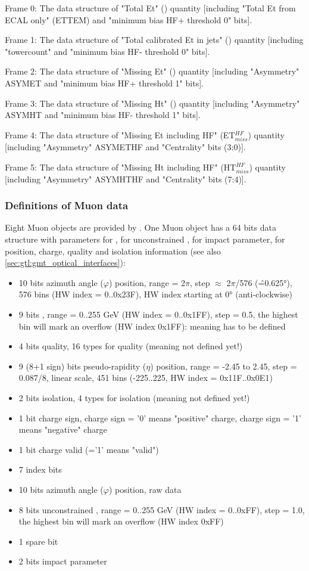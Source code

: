 Frame 0: The data structure of "Total Et" (\ett) quantity [including "Total Et from ECAL only" (ETTEM) and "minimum bias HF+ threshold 0" bits].

Frame 1: The data structure of "Total calibrated Et in jets" (\htt) quantity [including "towercount" and "minimum bias HF- threshold 0" bits].

Frame 2: The data structure of "Missing Et" (\etm) quantity [including "Asymmetry" ASYMET and "minimum bias HF+ threshold 1" bits].

Frame 3: The data structure of "Missing Ht" (\htm) quantity [including "Asymmetry" ASYMHT and "minimum bias HF- threshold 1" bits].

Frame 4: The data structure of "Missing Et including HF" (ET$_{miss}^{HF}$) quantity [including "Asymmetry" ASYMETHF and "Centrality" bits (3:0)].

Frame 5: The data structure of "Missing Ht including HF" (HT$_{miss}^{HF}$) quantity [including "Asymmetry" ASYMHTHF and "Centrality" bits (7:4)].

\clearpage

\subsubsection{Definitions of Muon data}
\label{sec:gtl:muon_data}
Eight Muon objects are provided by \gmt. One Muon object has a 64 bits data structure with parameters for \pt, for unconstrained \pt, for impact parameter, for position, charge, quality and isolation information (see also \ref{sec:gtl:gmt_optical_interfaces}):\\
\begin{itemize}
\item 10 bits azimuth angle ($\varphi$) position, range = 2$\pi$, step $\approx$ 2$\pi$/576 (\^=0.625°), 576 bins (HW index = 0..0x23F), HW index starting at 0° (anti-clockwise)
\item 9 bits \pt, range = 0..255 GeV (HW index = 0..0x1FF), step = 0.5, the highest bin will mark an overflow (HW index 0x1FF): meaning has to be defined
\item 4 bits quality, 16 types for quality (meaning not defined yet!)
\item 9 (8+1 sign) bits pseudo-rapidity ($\eta$) position, range = -2.45 to 2.45, step = 0.087/8, linear scale, 451 bins (-225..225, HW index = 0x11F..0x0E1)
\item 2 bits isolation, 4 types for isolation (meaning not defined yet!)
\item 1 bit charge sign, charge sign = '0' means "positive" charge, charge sign = '1' means "negative" charge
\item 1 bit charge valid (='1' means "valid")
\item 7 index bits
\item 10 bits azimuth angle ($\varphi$) position, raw data
\item 8 bits unconstrained \pt, range = 0..255 GeV (HW index = 0..0xFF), step = 1.0, the highest bin will mark an overflow (HW index 0xFF)
\item 1 spare bit
\item 2 bits impact parameter
\end{itemize}


